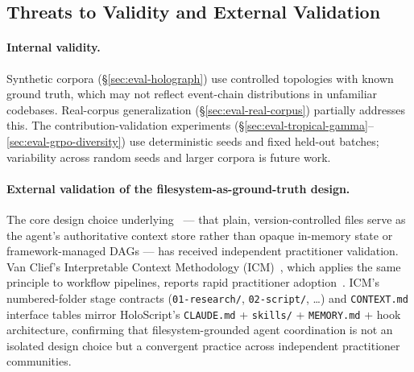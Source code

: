 \subsection{Threats to Validity and External Validation}
\label{sec:eval-threats}

\paragraph{Internal validity.}
Synthetic corpora (\S\ref{sec:eval-holograph}) use controlled topologies with
known ground truth, which may not reflect event-chain distributions in
unfamiliar codebases.  Real-corpus generalization (\S\ref{sec:eval-real-corpus})
partially addresses this.  The contribution-validation experiments
(\S\ref{sec:eval-tropical-gamma}--\ref{sec:eval-grpo-diversity}) use
deterministic seeds and fixed held-out batches; variability across random seeds
and larger corpora is future work.

\paragraph{External validation of the filesystem-as-ground-truth design.}
The core design choice underlying \HoloGraph\
--- that plain, version-controlled files serve as the agent's
authoritative context store rather than opaque in-memory state or
framework-managed DAGs --- has received independent practitioner
validation.  Van Clief's Interpretable Context Methodology
(ICM)~\cite{vanclief2026icm}, which applies the same principle to
workflow pipelines, reports rapid practitioner adoption~\cite{cliefnotes2026}.  ICM's
numbered-folder stage contracts (\texttt{01-research/},
\texttt{02-script/}, \dots) and \texttt{CONTEXT.md} interface tables
mirror HoloScript's \texttt{CLAUDE.md} + \texttt{skills/} +
\texttt{MEMORY.md} + hook architecture, confirming that
filesystem-grounded agent coordination is not an isolated design
choice but a convergent practice across independent practitioner
communities.
